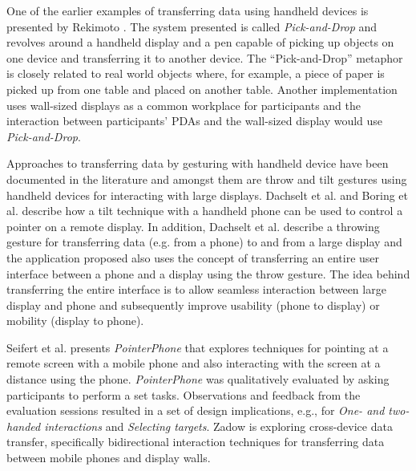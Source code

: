 One of the earlier examples of transferring data using handheld devices is presented by Rekimoto \cite{Rekimoto:1997}. 
The system presented is called \textit{Pick-and-Drop} and revolves around a handheld display and a pen capable of picking up objects on one device and transferring it to another device.
The ``Pick-and-Drop'' metaphor is closely related to real world objects where, for example, a piece of paper is picked up from one table and placed on another table.
Another implementation uses wall-sized displays as a common workplace for participants and the interaction between participants' PDAs and the wall-sized display would use \textit{Pick-and-Drop}.

Approaches to transferring data by gesturing with handheld device have been documented in the literature and amongst them are throw and tilt gestures using handheld devices for interacting with large displays.
Dachselt et al. \cite{Dachselt:2008} and Boring et al. \cite{Boring:2009} describe how a tilt technique with a handheld phone can be used to control a pointer on a remote display.
In addition, Dachselt et al. describe a throwing gesture for transferring data (e.g. from a phone) to and from a large display and the application proposed also uses the concept of transferring an entire user interface between a phone and a display using the throw gesture.
The idea behind transferring the entire interface is to allow seamless interaction between large display and phone and subsequently improve usability (phone to display) or mobility (display to phone).

Seifert et al. \cite{Seifert:2013} presents \textit{PointerPhone} that explores techniques for pointing at a remote screen with a mobile phone and also interacting with the screen at a distance using the phone.
\textit{PointerPhone} was qualitatively evaluated by asking participants to perform a set tasks.
Observations and feedback from the evaluation sessions resulted in a set of design implications, e.g., for \textit{One- and two-handed interactions} and \textit{Selecting targets}.
Zadow \cite{vonZadow:2015} is exploring cross-device data transfer, specifically bidirectional interaction techniques for transferring data between mobile phones and display walls.